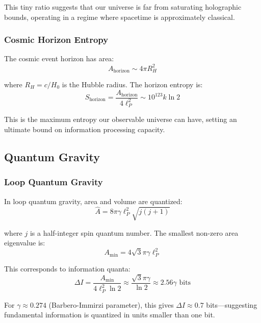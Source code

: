\documentclass[11pt,a4paper]{article}
\theoremstyle{plain}
\theoremstyle{definition}
\theoremstyle{remark}
\begin{document}
This tiny ratio suggests that our universe is far from saturating holographic bounds, operating in a regime where spacetime is approximately classical.

\subsubsection{Cosmic Horizon Entropy}

The cosmic event horizon has area:
\begin{equation}
A_{\text{horizon}} \sim 4\pi R_H^2
\end{equation}

where $R_H = c/H_0$ is the Hubble radius. The horizon entropy is:
\begin{equation}
S_{\text{horizon}} = \frac{A_{\text{horizon}}}{4\ell_P^2} \sim 10^{123}k\ln 2
\end{equation}

This is the maximum entropy our observable universe can have, setting an ultimate bound on information processing capacity.

\subsection{Quantum Gravity}

\subsubsection{Loop Quantum Gravity}

In loop quantum gravity, area and volume are quantized:
\begin{equation}
\hat{A} = 8\pi\gamma\ell_P^2\sqrt{j(j+1)}
\end{equation}

where $j$ is a half-integer spin quantum number. The smallest non-zero area eigenvalue is:
\begin{equation}
A_{\min} = 4\sqrt{3}\pi\gamma\ell_P^2
\end{equation}

This corresponds to information quanta:
\begin{equation}
\Delta I = \frac{A_{\min}}{4\ell_P^2\ln 2} \approx \frac{\sqrt{3}\pi\gamma}{\ln 2} \approx 2.56\gamma\text{ bits}
\end{equation}

For $\gamma \approx 0.274$ (Barbero-Immirzi parameter), this gives $\Delta I \approx 0.7$ bits—suggesting fundamental information is quantized in units smaller than one bit.
\end{document}
